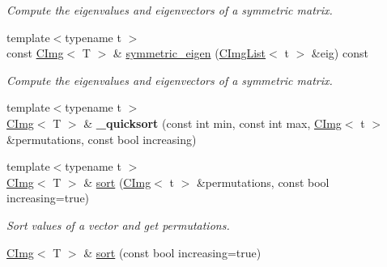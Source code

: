\begin{DoxyCompactItemize}
\begin{DoxyCompactList}\small\item\em Compute the eigenvalues and eigenvectors of a symmetric matrix. \item\end{DoxyCompactList}\item 
\hypertarget{structcimg__library_1_1_c_img_a42dedf55df4f9cec70395e6a0b701146}{
{\footnotesize template$<$typename t $>$ }\\const \hyperlink{structcimg__library_1_1_c_img}{CImg}$<$ T $>$ \& \hyperlink{structcimg__library_1_1_c_img_a42dedf55df4f9cec70395e6a0b701146}{symmetric\_\-eigen} (\hyperlink{structcimg__library_1_1_c_img_list}{CImgList}$<$ t $>$ \&eig) const }
\label{structcimg__library_1_1_c_img_a42dedf55df4f9cec70395e6a0b701146}

\begin{DoxyCompactList}\small\item\em Compute the eigenvalues and eigenvectors of a symmetric matrix. \item\end{DoxyCompactList}\item 
\hypertarget{structcimg__library_1_1_c_img_a5b451049a94ef2ff8c235144ca5b8b68}{
{\footnotesize template$<$typename t $>$ }\\\hyperlink{structcimg__library_1_1_c_img}{CImg}$<$ T $>$ \& {\bfseries \_\-quicksort} (const int min, const int max, \hyperlink{structcimg__library_1_1_c_img}{CImg}$<$ t $>$ \&permutations, const bool increasing)}
\label{structcimg__library_1_1_c_img_a5b451049a94ef2ff8c235144ca5b8b68}

\item 
\hypertarget{structcimg__library_1_1_c_img_ade39d3023aa16a6b8c2e97a0e1f7e8c4}{
{\footnotesize template$<$typename t $>$ }\\\hyperlink{structcimg__library_1_1_c_img}{CImg}$<$ T $>$ \& \hyperlink{structcimg__library_1_1_c_img_ade39d3023aa16a6b8c2e97a0e1f7e8c4}{sort} (\hyperlink{structcimg__library_1_1_c_img}{CImg}$<$ t $>$ \&permutations, const bool increasing=true)}
\label{structcimg__library_1_1_c_img_ade39d3023aa16a6b8c2e97a0e1f7e8c4}

\begin{DoxyCompactList}\small\item\em Sort values of a vector and get permutations. \item\end{DoxyCompactList}\item 
\hypertarget{structcimg__library_1_1_c_img_a9d2f2bc26cc2036abd75bdb7cae4882c}{
\hyperlink{structcimg__library_1_1_c_img}{CImg}$<$ T $>$ \& \hyperlink{structcimg__library_1_1_c_img_a9d2f2bc26cc2036abd75bdb7cae4882c}{sort} (const bool increasing=true)}
\label{structcimg__library_1_1_c_img_a9d2f2bc26cc2036abd75bdb7cae4882c}


\end{DoxyCompactItemize}
